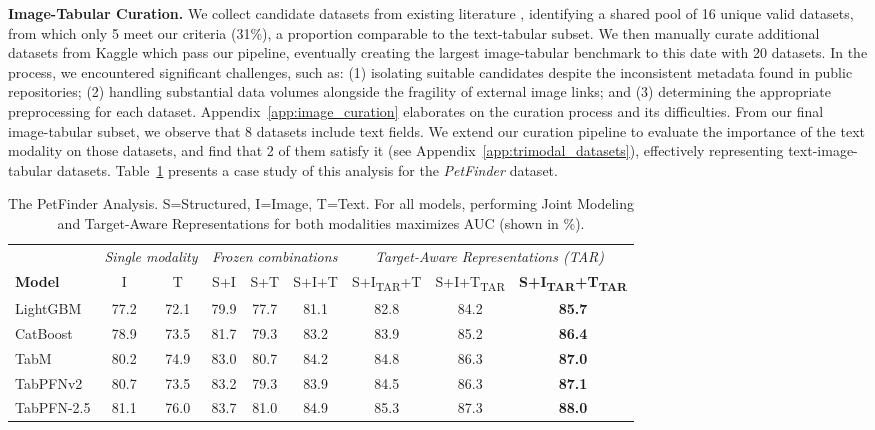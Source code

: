 \documentclass{llmxive}
\begin{document}
\textbf{Image-Tabular Curation.}\label{par:image_tabular_curation} We collect candidate datasets from existing literature \cite{lu_mug_2023, tang_bag_2024, luo_time_2025, kim_multimodalpfn_2025}, identifying a shared pool of 16 unique valid datasets, from which only 5 meet our criteria (31\%), a proportion comparable to the text-tabular subset. We then manually curate additional datasets from Kaggle which pass our pipeline, eventually creating the largest image-tabular benchmark to this date with 20 datasets. In the process, we encountered significant challenges, such as: (1) isolating suitable candidates despite the inconsistent metadata found in public repositories; (2) handling substantial data volumes alongside the fragility of external image links; and (3) determining the appropriate preprocessing for each dataset. Appendix~\ref{app:image_curation} elaborates on the curation process and its difficulties. From our final image-tabular subset, we observe that 8 datasets include text fields. We extend our curation pipeline to evaluate the importance of the text modality on those datasets, and find that 2 of them satisfy it (see Appendix~\ref{app:trimodal_datasets}), effectively representing text-image-tabular datasets. Table~\ref{tab:petfinder} presents a case study of this analysis for the \textit{PetFinder} dataset.

\begin{table}[ht]
\centering
\setlength{\tabcolsep}{4pt}
\small
\begin{tabular}{l cc ccc ccc}
\toprule
 & \multicolumn{2}{c}{\textit{Single modality}} & \multicolumn{3}{c}{\textit{Frozen combinations}} & \multicolumn{3}{c}{\textit{Target-Aware Representations (TAR)}} \\
\cmidrule(lr){2-3}\cmidrule(lr){4-6}\cmidrule(lr){7-9}
\textbf{Model} & I & T & S+I & S+T & S+I+T & S+I\textsubscript{TAR}+T & S+I+T\textsubscript{TAR} & \textbf{S+I\textsubscript{TAR}+T\textsubscript{TAR}} \\
\midrule
LightGBM    & 77.2 & 72.1 & 79.9 & 77.7 & 81.1 & 82.8 & 84.2 & \textbf{85.7} \\
CatBoost    & 78.9 & 73.5 & 81.7 & 79.3 & 83.2 & 83.9 & 85.2 & \textbf{86.4} \\
TabM        & 80.2 & 74.9 & 83.0 & 80.7 & 84.2 & 84.8 & 86.3 & \textbf{87.0} \\
TabPFNv2   & 80.7 & 73.5 & 83.2 & 79.3 & 83.9 & 84.5 & 86.3 & \textbf{87.1} \\
TabPFN-2.5 & 81.1 & 76.0 & 83.7 & 81.0 & 84.9 & 85.3 & 87.3 & \textbf{88.0} \\
\bottomrule
\end{tabular}
\caption{The PetFinder Analysis. S=Structured, I=Image, T=Text. For all models, performing Joint Modeling and Target-Aware Representations for both modalities maximizes AUC (shown in \%).}
\label{tab:petfinder}
\end{table}
\end{document}
